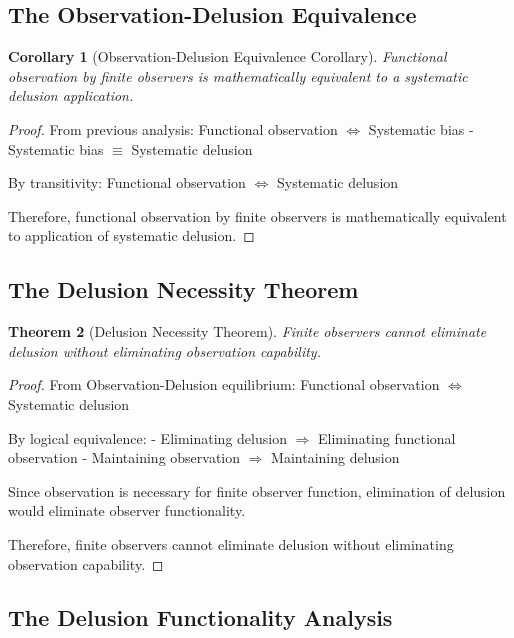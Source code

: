 \documentclass[12pt,a4paper]{article}
\newtheorem{theorem}{Theorem}[section]
\newtheorem{corollary}[theorem]{Corollary}
\begin{document}
\subsection{The Observation-Delusion Equivalence}

\begin{corollary}[Observation-Delusion Equivalence Corollary]
Functional observation by finite observers is mathematically equivalent to a systematic delusion application.
\end{corollary}

\begin{proof}
From previous analysis:
 Functional observation $\Leftrightarrow$ Systematic bias
- Systematic bias $\equiv$ Systematic delusion

By transitivity: Functional observation $\Leftrightarrow$ Systematic delusion

Therefore, functional observation by finite observers is mathematically equivalent to application of systematic delusion.
\end{proof}

\subsection{The Delusion Necessity Theorem}

\begin{theorem}[Delusion Necessity Theorem]
Finite observers cannot eliminate delusion without eliminating observation capability.
\end{theorem}

\begin{proof}
From Observation-Delusion equilibrium: Functional observation $\Leftrightarrow$ Systematic delusion

By logical equivalence:
- Eliminating delusion $\Rightarrow$ Eliminating functional observation
- Maintaining observation $\Rightarrow$ Maintaining delusion

Since observation is necessary for finite observer function, elimination of delusion would eliminate observer functionality.

Therefore, finite observers cannot eliminate delusion without eliminating observation capability.
\end{proof}

\subsection{The Delusion Functionality Analysis}
\end{document}

